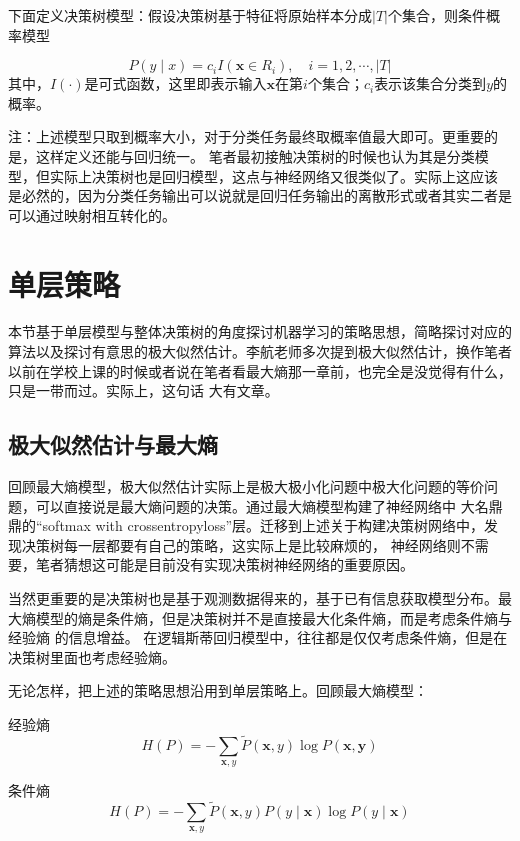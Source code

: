 \documentclass{article}
\begin{document}
        下面定义决策树模型：假设决策树基于特征将原始样本分成$\left|T\right|$个集合，则条件概率模型
        
        \[P(y \mid x)=c_iI(\boldsymbol{x}\in R_i),\quad i=1,2,\cdots,\left|T\right|\]
        其中，$I(\cdot)$是可式函数，这里即表示输入$\boldsymbol{x}$在第$i$个集合；$c_i$表示该集合分类到$y$的概率。

        注：上述模型只取到概率大小，对于分类任务最终取概率值最大即可。更重要的是，这样定义还能与回归统一。
        笔者最初接触决策树的时候也认为其是分类模型，但实际上决策树也是回归模型，这点与神经网络又很类似了。实际上这应该
        是必然的，因为分类任务输出可以说就是回归任务输出的离散形式或者其实二者是可以通过映射相互转化的。

    \section{单层策略}
        本节基于单层模型与整体决策树的角度探讨机器学习的策略思想，简略探讨对应的算法以及探讨有意思的极大似然估计。李航老师多次提到极大似然估计，换作笔者以前在学校上课的时候或者说在笔者看最大熵那一章前，也完全是没觉得有什么，只是一带而过。实际上，这句话
        大有文章。

        \subsection{极大似然估计与最大熵}
        

        回顾最大熵模型，极大似然估计实际上是极大极小化问题中极大化问题的等价问题，可以直接说是最大熵问题的决策。通过最大熵模型构建了神经网络中
        大名鼎鼎的“softmax with crossentropyloss”层。迁移到上述关于构建决策树网络中，发现决策树每一层都要有自己的策略，这实际上是比较麻烦的，
        神经网络则不需要，笔者猜想这可能是目前没有实现决策树神经网络的重要原因。

        当然更重要的是决策树也是基于观测数据得来的，基于已有信息获取模型分布。最大熵模型的熵是条件熵，但是决策树并不是直接最大化条件熵，而是考虑条件熵与经验熵
        的信息增益。
        在逻辑斯蒂回归模型中，往往都是仅仅考虑条件熵，但是在决策树里面也考虑经验熵。

        无论怎样，把上述的策略思想沿用到单层策略上。回顾最大熵模型：
        
        经验熵
        \[H(P)=-\sum_{\boldsymbol{x},y}\widetilde{P}(\boldsymbol{x},y)\log P(\boldsymbol{x,y})\]

        条件熵
        \[H(P)=-\sum_{\boldsymbol{x},y}\widetilde{P}(\boldsymbol{x},y)P(y\mid\boldsymbol{x})\log P(y\mid\boldsymbol{x})\]
\end{document}
